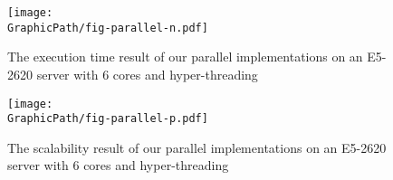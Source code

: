 \begin{frame}
	\begin{center}
		\scalebox{0.9} { \begin{minipage}{\textwidth}
			\begin{figure}
			  \centering
			  \texttt{[image: \\GraphicPath/fig-parallel-n.pdf]}
			  \label{fig:fig-parallel}
			  \caption{
			  	The execution time result of our parallel
			    implementations on an E5-2620 server with 6 cores and
			    hyper-threading}
			\end{figure}
			\end{minipage}
		}
	\end{center}
\end{frame}


\begin{frame}
	\begin{center}
		\scalebox{0.9} { \begin{minipage}{\textwidth}
			\begin{figure}
			  \centering
			  \texttt{[image: \\GraphicPath/fig-parallel-p.pdf]}
			  \label{fig:fig-parallel-scala}
			  \caption{
			  	The scalability result of our parallel implementations
			    on an E5-2620 server with 6 cores and hyper-threading}
			\end{figure}
			\end{minipage}
		}
	\end{center}
\end{frame}